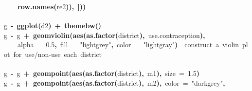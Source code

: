 \documentclass{article}
\makeatletter
\newcommand{\hlnumber}[1]{\textcolor[rgb]{0,0,0}{#1}}%
\newcommand{\hlfunctioncall}[1]{\textcolor[rgb]{.5,0,.33}{\textbf{#1}}}%
\newcommand{\hlstring}[1]{\textcolor[rgb]{.6,.6,1}{#1}}%
\newcommand{\hlkeyword}[1]{\textbf{#1}}%
\newcommand{\hlargument}[1]{\textcolor[rgb]{.69,.25,.02}{#1}}%
\newcommand{\hlcomment}[1]{\textcolor[rgb]{.18,.6,.34}{#1}}%
\newcommand{\hlassignement}[1]{\textbf{#1}}%
\newcommand{\hlsymbol}[1]{#1}%
\newcommand{\hlstd}[1]{\textcolor[rgb]{0,0,0}{#1}}%
\newenvironment{kframe}{%
 \def\FrameCommand##1{\hskip\@totalleftmargin \hskip-\fboxsep
 \colorbox{shadecolor}{##1}\hskip-\fboxsep
     \hskip-\linewidth \hskip-\@totalleftmargin \hskip\columnwidth}%
 \MakeFramed {\advance\hsize-\width
   \@totalleftmargin\z@ \linewidth\hsize
   \@setminipage}}%
 {\par\unskip\endMakeFramed}
\newenvironment{knitrout}{}{} %
\makeatother
\begin{document}
\begin{knitrout}
{\begin{kframe}
\begin{flushleft}
\hlstd{}{\ }{\ }{\ }{\ }\hlfunctioncall{row.names}\hlkeyword{(}\hlsymbol{re2}\hlkeyword{)}\hlkeyword{)}\hlkeyword{,}{\ }\hlkeyword{]}\hlkeyword{)}\hlkeyword{)}\hspace*{\fill}\\
\hlstd{}\hspace*{\fill}\\
\hlstd{}\hlsymbol{g}{\ }\hlassignement{\usebox{\hlnormalsizeboxlessthan}-}{\ }\hlfunctioncall{ggplot}\hlkeyword{(}\hlsymbol{d2}\hlkeyword{)}{\ }\hlkeyword{+}{\ }\hlfunctioncall{theme\usebox{\hlnormalsizeboxunderscore}bw}\hlkeyword{(}\hlkeyword{)}\hspace*{\fill}\\
\hlstd{}\hlsymbol{g}{\ }\hlassignement{\usebox{\hlnormalsizeboxlessthan}-}{\ }\hlsymbol{g}{\ }\hlkeyword{+}{\ }\hlfunctioncall{geom\usebox{\hlnormalsizeboxunderscore}violin}\hlkeyword{(}\hlfunctioncall{aes}\hlkeyword{(}\hlfunctioncall{as.factor}\hlkeyword{(}\hlsymbol{district}\hlkeyword{)}\hlkeyword{,}{\ }\hlsymbol{use.contraception}\hlkeyword{)}\hlkeyword{,}\hspace*{\fill}\\
\hlstd{}{\ }{\ }{\ }{\ }\hlargument{alpha}{\ }\hlargument{=}{\ }\hlnumber{0.5}\hlkeyword{,}{\ }\hlargument{fill}{\ }\hlargument{=}{\ }\hlstring{"lightgrey"}\hlkeyword{,}{\ }\hlargument{color}{\ }\hlargument{=}{\ }\hlstring{"lightgray"}\hlkeyword{)}{\ }{\ }\hlcomment{\usebox{\hlnormalsizeboxhash}\usebox{\hlnormalsizeboxhash}{\ }construct{\ }a{\ }violin{\ }plot{\ }for{\ }use/non-use{\ }each{\ }district}\hspace*{\fill}\\
\hlstd{}\hspace*{\fill}\\
\hlstd{}\hlsymbol{g}{\ }\hlassignement{\usebox{\hlnormalsizeboxlessthan}-}{\ }\hlsymbol{g}{\ }\hlkeyword{+}{\ }\hlfunctioncall{geom\usebox{\hlnormalsizeboxunderscore}point}\hlkeyword{(}\hlfunctioncall{aes}\hlkeyword{(}\hlfunctioncall{as.factor}\hlkeyword{(}\hlsymbol{district}\hlkeyword{)}\hlkeyword{,}{\ }\hlsymbol{m1}\hlkeyword{)}\hlkeyword{,}{\ }\hlargument{size}{\ }\hlargument{=}{\ }\hlnumber{1.5}\hlkeyword{)}\hspace*{\fill}\\
\hlstd{}\hlsymbol{g}{\ }\hlassignement{\usebox{\hlnormalsizeboxlessthan}-}{\ }\hlsymbol{g}{\ }\hlkeyword{+}{\ }\hlfunctioncall{geom\usebox{\hlnormalsizeboxunderscore}point}\hlkeyword{(}\hlfunctioncall{aes}\hlkeyword{(}\hlfunctioncall{as.factor}\hlkeyword{(}\hlsymbol{district}\hlkeyword{)}\hlkeyword{,}{\ }\hlsymbol{m2}\hlkeyword{)}\hlkeyword{,}{\ }\hlargument{color}{\ }\hlargument{=}{\ }\hlstring{"darkgrey"}\hlkeyword{,}\hspace*{\fill}\\

\end{flushleft}
\end{kframe}}
\end{knitrout}
\end{document}
